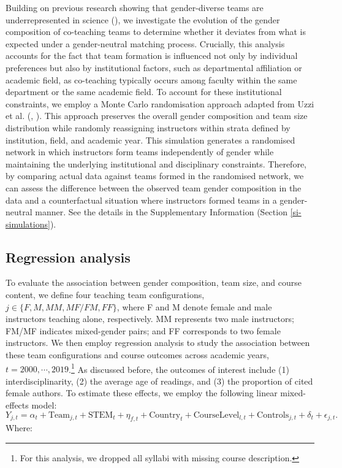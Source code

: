 \documentclass[
  british,
  12pt, %
]{article}
\begin{document}
Building on previous research showing that gender-diverse teams are underrepresented in science (), we investigate the evolution of the gender composition of co-teaching teams to determine whether it deviates from what is expected under a gender-neutral matching process. Crucially, this analysis accounts for the fact that team formation is influenced not only by individual preferences but also by institutional factors, such as departmental affiliation or academic field, as co-teaching typically occurs among faculty within the same department or the same academic field. To account for these institutional constraints, we employ a Monte Carlo randomisation approach adapted from Uzzi et al. (, ). This approach preserves the overall gender composition and team size distribution while randomly reassigning instructors within strata defined by institution, field, and academic year. This simulation generates a randomised network in which instructors form teams independently of gender while maintaining the underlying institutional and disciplinary constraints. Therefore, by comparing actual data against teams formed in the randomised network, we can assess the difference between the observed team gender composition in the data and a counterfactual situation where instructors formed teams in a gender-neutral manner. See the details in the Supplementary Information (Section \ref{si-simulations}).

\subsection{Regression analysis}\label{regression-analysis}

To evaluate the association between gender composition, team size, and course content, we define four teaching team configurations, \(j\in \{F, M, MM, MF/FM, FF\}\), where F and M denote female and male instructors teaching alone, respectively. MM represents two male instructors; FM/MF indicates mixed-gender pairs; and FF corresponds to two female instructors. We then employ regression analysis to study the association between these team configurations and course outcomes across academic years, \(t = 2000, \cdots, 2019\).\footnote{For this analysis, we dropped all syllabi with missing course description.} As discussed before, the outcomes of interest include (1) interdisciplinarity, (2) the average age of readings, and (3) the proportion of cited female authors. To estimate these effects, we employ the following linear mixed-effects model:
\[
Y_{j, t} = 
 \alpha_t + 
 \text{Team}_{j, t} + 
 \text{STEM}_t + \eta_{f,t} +  %
 \text{Country}_{t} + 
 \text{CourseLevel}_{l,t} + 
 \text{Controls}_{j,t} + 
 \delta_{t} + 
 \epsilon_{j, t}.
\]
Where:
\end{document}
